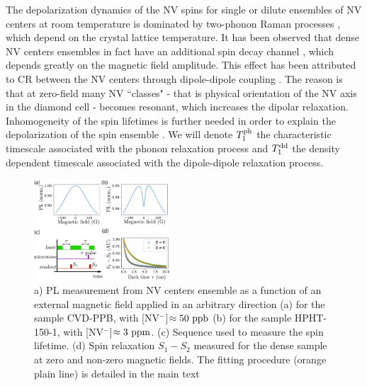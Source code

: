 \documentclass[preprintnumbers,amsmath,amssymb,superscriptaddress,twocolumn,showpacs]{revtex4-2}
\begin{document}
The depolarization dynamics of the NV spins for single or dilute ensembles of NV centers at room temperature is dominated by two-phonon Raman processes \citep{redman1991spin,jarmola_temperature-_2012,norambuena2018spin}, which depend on the crystal lattice temperature. It has been observed that dense NV centers ensembles in fact  have an additional spin decay channel \citep{jarmola_temperature-_2012,jarmola_longitudinal_2015,mrozek_longitudinal_2015, choi2017depolarization, akhmedzhanov_microwave-free_2017, akhmedzhanov_magnetometry_2019, pellet2021magnetic, mrozek2021characterization}, which depends greatly on the magnetic field amplitude. This effect has been attributed to CR between the NV centers through dipole-dipole coupling \citep{mrozek_longitudinal_2015, choi2017depolarization}. 
The reason is that at zero-field many NV ``classes" - that is physical orientation of the NV axis in the diamond cell - becomes resonant, which increases the dipolar relaxation.
Inhomogeneity of the spin lifetimes is further needed in order to explain the depolarization of the spin ensemble \citep{choi2017depolarization}. We will denote $T_1^{\rm ph}$ the characteristic timescale associated with the phonon relaxation process and $T_1^{\rm dd}$ the density dependent timescale associated with the dipole-dipole relaxation process.

\begin{figure}
\includegraphics[width=0.45\textwidth]{fig_T1.pdf}
\caption{a) PL measurement from NV centers ensemble as a function of an external magnetic field applied in an arbitrary direction (a) for the sample CVD-PPB, with [NV$^-$]$\approx 50\ \rm ppb$ (b) for the sample HPHT-150-1, with [NV$^-$]$\approx 3\ \rm ppm$. (c) Sequence used to measure the spin lifetime. (d) Spin relaxation $S_1-S_2$ measured for the dense sample at zero and non-zero magnetic fields. The fitting procedure (orange plain line) is detailed in the main text}
\label{T1}
\end{figure}
\end{document}
